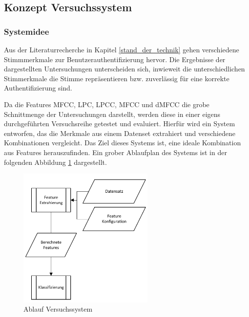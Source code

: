 \subsection{Konzept Versuchssystem}

\subsubsection{Systemidee}

Aus der Literaturrecherche in Kapitel \ref{stand_der_technik} gehen verschiedene Stimmmerkmale zur Benutzerauthentifizierung hervor.
Die Ergebnisse der dargestellten Untersuchungen unterscheiden sich, inwieweit die unterschiedlichen Stimmerkmale die Stimme repräsentieren bzw. zuverlässig für eine korrekte Authentifizierung sind.

Da die Features \ac{MFCC}, \ac{LPC}, \ac{LPCC}, \ac{MFCC} und \ac{dMFCC} die grobe Schnittmenge der Untersuchungen darstellt, werden diese in einer eigens durchgeführten Versuchsreihe getestet und evaluiert.
Hierfür wird ein System entworfen, das die Merkmale aus einem Datenset extrahiert und verschiedene Kombinationen vergleicht.
Das Ziel dieses Systems ist, eine ideale Kombination aus Features herauszufinden.
Ein grober Ablaufplan des Systems ist in der folgenden Abbildung \ref{fig:PAP_DemoSystem} dargestellt.
\begin{figure}[H]
    \centering
    \includegraphics[width=0.6\textwidth, keepaspectratio]{images/PAP_Demosystem.pdf}
    \caption{Ablauf Versuchssystem}
    \label{fig:PAP_DemoSystem}
\end{figure}


